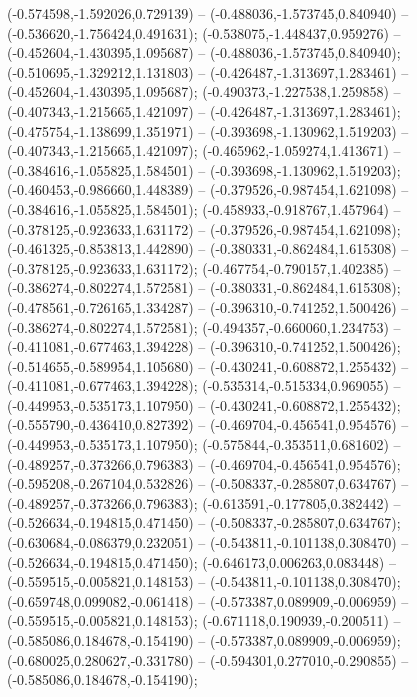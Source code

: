  (-0.574598,-1.592026,0.729139) -- (-0.488036,-1.573745,0.840940) -- (-0.536620,-1.756424,0.491631);
 (-0.538075,-1.448437,0.959276) -- (-0.452604,-1.430395,1.095687) -- (-0.488036,-1.573745,0.840940);
 (-0.510695,-1.329212,1.131803) -- (-0.426487,-1.313697,1.283461) -- (-0.452604,-1.430395,1.095687);
 (-0.490373,-1.227538,1.259858) -- (-0.407343,-1.215665,1.421097) -- (-0.426487,-1.313697,1.283461);
 (-0.475754,-1.138699,1.351971) -- (-0.393698,-1.130962,1.519203) -- (-0.407343,-1.215665,1.421097);
 (-0.465962,-1.059274,1.413671) -- (-0.384616,-1.055825,1.584501) -- (-0.393698,-1.130962,1.519203);
 (-0.460453,-0.986660,1.448389) -- (-0.379526,-0.987454,1.621098) -- (-0.384616,-1.055825,1.584501);
 (-0.458933,-0.918767,1.457964) -- (-0.378125,-0.923633,1.631172) -- (-0.379526,-0.987454,1.621098);
 (-0.461325,-0.853813,1.442890) -- (-0.380331,-0.862484,1.615308) -- (-0.378125,-0.923633,1.631172);
 (-0.467754,-0.790157,1.402385) -- (-0.386274,-0.802274,1.572581) -- (-0.380331,-0.862484,1.615308);
 (-0.478561,-0.726165,1.334287) -- (-0.396310,-0.741252,1.500426) -- (-0.386274,-0.802274,1.572581);
 (-0.494357,-0.660060,1.234753) -- (-0.411081,-0.677463,1.394228) -- (-0.396310,-0.741252,1.500426);
 (-0.514655,-0.589954,1.105680) -- (-0.430241,-0.608872,1.255432) -- (-0.411081,-0.677463,1.394228);
 (-0.535314,-0.515334,0.969055) -- (-0.449953,-0.535173,1.107950) -- (-0.430241,-0.608872,1.255432);
 (-0.555790,-0.436410,0.827392) -- (-0.469704,-0.456541,0.954576) -- (-0.449953,-0.535173,1.107950);
 (-0.575844,-0.353511,0.681602) -- (-0.489257,-0.373266,0.796383) -- (-0.469704,-0.456541,0.954576);
 (-0.595208,-0.267104,0.532826) -- (-0.508337,-0.285807,0.634767) -- (-0.489257,-0.373266,0.796383);
 (-0.613591,-0.177805,0.382442) -- (-0.526634,-0.194815,0.471450) -- (-0.508337,-0.285807,0.634767);
 (-0.630684,-0.086379,0.232051) -- (-0.543811,-0.101138,0.308470) -- (-0.526634,-0.194815,0.471450);
 (-0.646173,0.006263,0.083448) -- (-0.559515,-0.005821,0.148153) -- (-0.543811,-0.101138,0.308470);
 (-0.659748,0.099082,-0.061418) -- (-0.573387,0.089909,-0.006959) -- (-0.559515,-0.005821,0.148153);
 (-0.671118,0.190939,-0.200511) -- (-0.585086,0.184678,-0.154190) -- (-0.573387,0.089909,-0.006959);
 (-0.680025,0.280627,-0.331780) -- (-0.594301,0.277010,-0.290855) -- (-0.585086,0.184678,-0.154190);
